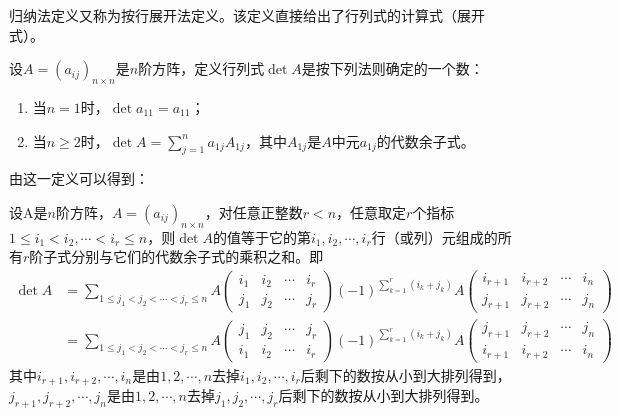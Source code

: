             $ $

            归纳法定义又称为按行展开法定义。该定义直接给出了行列式的计算式（展开式）。

            \begin{definition}[归纳法定义]
                \label{def_det:induction}
                设$A=(a_{ij})_{n\times n}$是$n$阶方阵，定义行列式$\det A$是按下列法则确定的一个数：
                \begin{enumerate}
                    \item 当$n=1$时，$\det a_{11}=a_{11}$；
                    \item 当$n\geq 2$时，$\det A=\sum\limits_{j=1}^{n}a_{1j}A_{1j}$，其中$A_{1j}$是$A$中元$a_{1j}$的代数余子式。
                \end{enumerate}
            \end{definition}

            由这一定义可以得到：

            \begin{theorem}[Laplace展开定理]
                \label{thm_det:Laplace}
                设A是$n$阶方阵，$A=(a_{ij})_{n\times n}$，对任意正整数$r<n$，任意取定$r$个指标$1\leq i_1<i_2,\cdots<i_r\leq n$，则$\det A$的值等于它的第$i_1,i_2,\cdots,i_r$行（或列）元组成的所有$r$阶子式分别与它们的代数余子式的乘积之和。即
                \begin{equation*}
                    \begin{split}
                        \det A &= \sum_{1\leq j_1<j_2<\cdots<j_r\leq n}A\begin{pmatrix} i_1 & i_2 & \cdots & i_r \\ j_1 & j_2 & \cdots & j_r\end{pmatrix}(-1)^{\sum\limits_{k=1}^{r}(i_k +j_k)}A\begin{pmatrix}i_{r+1} & i_{r+2} & \cdots & i_n \\ j_{r+1} & j_{r+2} & \cdots & j_n\end{pmatrix} \\
                               &= \sum_{1\leq j_1<j_2<\cdots<j_r\leq n}A\begin{pmatrix} j_1 & j_2 & \cdots & j_r \\ i_1 & i_2 & \cdots & i_r\end{pmatrix}(-1)^{\sum\limits_{k=1}^{r}(i_k +j_k)}A\begin{pmatrix}j_{r+1} & j_{r+2} & \cdots & j_n \\ i_{r+1} & i_{r+2} & \cdots & i_n\end{pmatrix}
                    \end{split}
                \end{equation*}
                其中$i_{r+1},i_{r+2},\cdots,i_n$是由$1,2,\cdots,n$去掉$i_1,i_2,\cdots,i_r$后剩下的数按从小到大排列得到，$j_{r+1},j_{r+2},\cdots,j_n$是由$1,2,\cdots,n$去掉$j_1,j_2,\cdots,j_r$后剩下的数按从小到大排列得到。
            \end{theorem}

